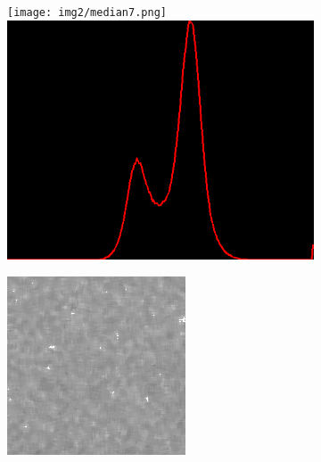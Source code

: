 \begin{figure}[H]
\begin{subfigure}[b]{0.24\textwidth}
        \texttt{[image: img2/median7.png]}\\[0.1cm]
        \includegraphics[width=\textwidth]{img2/hist_7_median_7_final_img2.png}
        \begin{center}
        	\text{ }
        \end{center}
        \includegraphics[width=\textwidth]{img2/rect_7_median_7_final_img2.png}\\[0.1cm]

\end{subfigure}
\end{figure}
